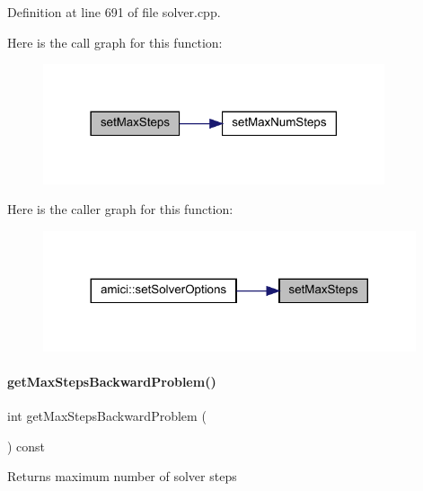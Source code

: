 Definition at line 691 of file solver.\+cpp.

Here is the call graph for this function\+:
\nopagebreak
\begin{figure}[H]
\begin{center}
\leavevmode
\includegraphics[width=285pt]{classamici_1_1_solver_ab321627a9f9d22013638e0eb9b14d2dc_cgraph}
\end{center}
\end{figure}
Here is the caller graph for this function\+:
\nopagebreak
\begin{figure}[H]
\begin{center}
\leavevmode
\includegraphics[width=311pt]{classamici_1_1_solver_ab321627a9f9d22013638e0eb9b14d2dc_icgraph}
\end{center}
\end{figure}
\mbox{\label{classamici_1_1_solver_a8f683e8adf7b34cab6dff296b1d38c83}} 
\paragraph{\texorpdfstring{getMaxStepsBackwardProblem()}{getMaxStepsBackwardProblem()}}
{\footnotesize\ttfamily int get\+Max\+Steps\+Backward\+Problem (\begin{DoxyParamCaption}{ }\end{DoxyParamCaption}) const}

\begin{DoxyReturn}{Returns}
maximum number of solver steps 
\end{DoxyReturn}


